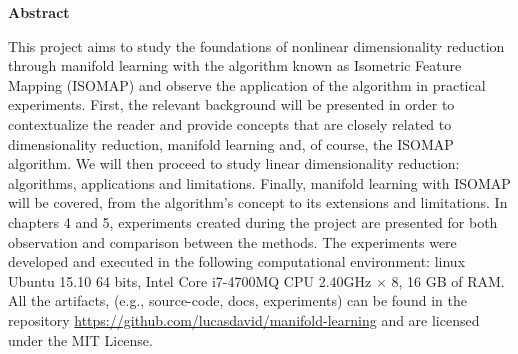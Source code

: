 \begin{center}
	\textbf{Abstract}
\end{center}

This project aims to study the foundations of nonlinear dimensionality reduction through manifold learning with the algorithm known as Isometric Feature Mapping (ISOMAP) and observe the application of the algorithm in practical experiments. First, the relevant background will be presented in order to contextualize the reader and provide concepts that are closely related to dimensionality reduction, manifold learning and, of course, the ISOMAP algorithm. We will then proceed to study linear dimensionality reduction: algorithms, applications and limitations. Finally, manifold learning with ISOMAP will be covered, from the algorithm's concept to its extensions and limitations. In chapters 4 and 5, experiments created during the project are presented for both observation and comparison between the methods. The experiments were developed and executed in the following computational environment: linux Ubuntu 15.10 64 bits, Intel Core i7-4700MQ CPU 2.40GHz $\times$ 8, 16 GB of RAM. All the artifacts, (e.g., source-code, docs, experiments) can be found in the repository \url{https://github.com/lucasdavid/manifold-learning} and are licensed under the MIT License.
